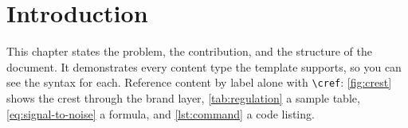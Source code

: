 \chapter{Introduction}
This chapter states the problem, the contribution, and the structure of the document. It demonstrates every content type the template supports, so you can see the syntax for each. Reference content by label alone with \texttt{\textbackslash cref}: \cref{fig:crest} shows the crest through the brand layer, \cref{tab:regulation} a sample table, \cref{eq:signal-to-noise} a formula, and \cref{lst:command} a code listing.


